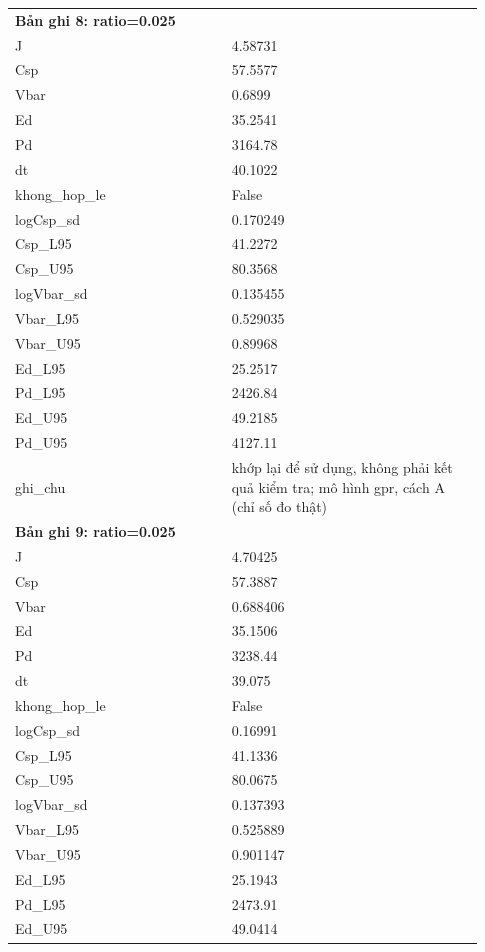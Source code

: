 \begin{longtable}{p{0.43\linewidth}p{0.50\linewidth}}
\midrule
\multicolumn{2}{p{0.95\linewidth}}{\textbf{Bản ghi 8: ratio=0.025}} \\
J & 4.58731 \\
Csp & 57.5577 \\
Vbar & 0.6899 \\
Ed & 35.2541 \\
Pd & 3164.78 \\
dt & 40.1022 \\
khong\_\allowbreak hop\_\allowbreak le & False \\
logCsp\_\allowbreak sd & 0.170249 \\
Csp\_\allowbreak L95 & 41.2272 \\
Csp\_\allowbreak U95 & 80.3568 \\
logVbar\_\allowbreak sd & 0.135455 \\
Vbar\_\allowbreak L95 & 0.529035 \\
Vbar\_\allowbreak U95 & 0.89968 \\
Ed\_\allowbreak L95 & 25.2517 \\
Pd\_\allowbreak L95 & 2426.84 \\
Ed\_\allowbreak U95 & 49.2185 \\
Pd\_\allowbreak U95 & 4127.11 \\
ghi\_\allowbreak chu & khớp lại để sử dụng, không phải kết quả kiểm tra; mô hình gpr, cách A (chỉ số đo thật) \\
\midrule
\multicolumn{2}{p{0.95\linewidth}}{\textbf{Bản ghi 9: ratio=0.025}} \\
J & 4.70425 \\
Csp & 57.3887 \\
Vbar & 0.688406 \\
Ed & 35.1506 \\
Pd & 3238.44 \\
dt & 39.075 \\
khong\_\allowbreak hop\_\allowbreak le & False \\
logCsp\_\allowbreak sd & 0.16991 \\
Csp\_\allowbreak L95 & 41.1336 \\
Csp\_\allowbreak U95 & 80.0675 \\
logVbar\_\allowbreak sd & 0.137393 \\
Vbar\_\allowbreak L95 & 0.525889 \\
Vbar\_\allowbreak U95 & 0.901147 \\
Ed\_\allowbreak L95 & 25.1943 \\
Pd\_\allowbreak L95 & 2473.91 \\
Ed\_\allowbreak U95 & 49.0414 \\

\end{longtable}
